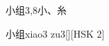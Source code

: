 \begin{entry}{小组}{3,8}{⼩、⽷}
  \begin{phonetics}{小组}{xiao3 zu3}[][HSK 2]
  \end{phonetics}
\end{entry}
